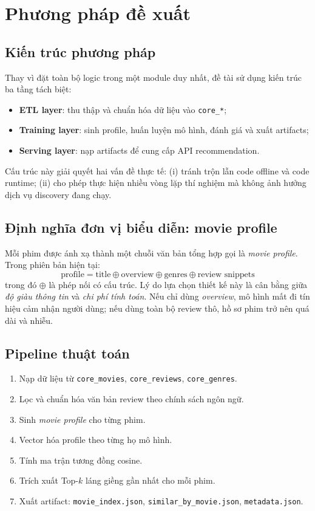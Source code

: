 \chapter{Phương pháp đề xuất}

\section{Kiến trúc phương pháp}
Thay vì đặt toàn bộ logic trong một module duy nhất, đề tài sử dụng kiến trúc ba tầng tách biệt:
\begin{itemize}
    \item \textbf{ETL layer}: thu thập và chuẩn hóa dữ liệu vào \texttt{core\_*};
    \item \textbf{Training layer}: sinh profile, huấn luyện mô hình, đánh giá và xuất artifacts;
    \item \textbf{Serving layer}: nạp artifacts để cung cấp API recommendation.
\end{itemize}

Cấu trúc này giải quyết hai vấn đề thực tế: (i) tránh trộn lẫn code offline và code runtime; (ii) cho phép thực hiện nhiều vòng lặp thí nghiệm mà không ảnh hưởng dịch vụ discovery đang chạy.

\section{Định nghĩa đơn vị biểu diễn: movie profile}
Mỗi phim được ánh xạ thành một chuỗi văn bản tổng hợp gọi là \textit{movie profile}. Trong phiên bản hiện tại:
\[
\text{profile} = \text{title} \oplus \text{overview} \oplus \text{genres} \oplus \text{review snippets}
\]
trong đó $\oplus$ là phép nối có cấu trúc. Lý do lựa chọn thiết kế này là cân bằng giữa \textit{độ giàu thông tin} và \textit{chi phí tính toán}. Nếu chỉ dùng \textit{overview}, mô hình mất đi tín hiệu cảm nhận người dùng; nếu dùng toàn bộ review thô, hồ sơ phim trở nên quá dài và nhiễu.

\section{Pipeline thuật toán}
\begin{enumerate}[label=\arabic*.]
    \item Nạp dữ liệu từ \texttt{core\_movies}, \texttt{core\_reviews}, \texttt{core\_genres}.
    \item Lọc và chuẩn hóa văn bản review theo chính sách ngôn ngữ.
    \item Sinh \textit{movie profile} cho từng phim.
    \item Vector hóa profile theo từng họ mô hình.
    \item Tính ma trận tương đồng cosine.
    \item Trích xuất Top-$k$ láng giềng gần nhất cho mỗi phim.
    \item Xuất artifact: \texttt{movie\_index.json}, \texttt{similar\_by\_movie.json}, \texttt{metadata.json}.
\end{enumerate}

